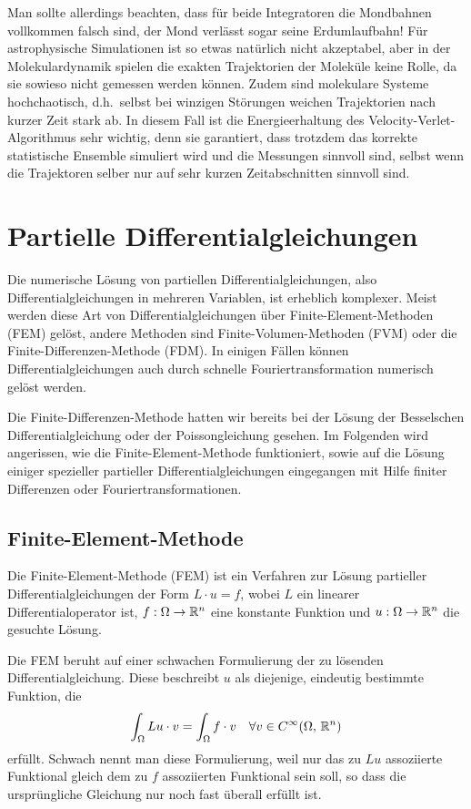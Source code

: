 Man sollte allerdings beachten, dass für beide Integratoren die
Mondbahnen vollkommen falsch sind, der Mond verlässt sogar seine
Erdumlaufbahn! Für astrophysische Simulationen ist so etwas natürlich
nicht akzeptabel, aber in der Molekulardynamik spielen die exakten
Trajektorien der Moleküle keine Rolle, da sie sowieso nicht gemessen
werden können. Zudem sind molekulare Systeme hochchaotisch, d.h.\
selbst bei winzigen Störungen weichen Trajektorien nach kurzer Zeit
stark ab. In diesem Fall ist die Energieerhaltung des
Velocity-Verlet-Algorithmus sehr wichtig, denn sie garantiert, dass
trotzdem das korrekte statistische Ensemble simuliert wird und die
Messungen sinnvoll sind, selbst wenn die Trajektoren selber nur auf
sehr kurzen Zeitabschnitten sinnvoll sind.

\section{Partielle Differentialgleichungen}

Die numerische Lösung von partiellen Differentialgleichungen, also
Differentialgleichungen in mehreren Variablen, ist erheblich
komplexer. Meist werden diese Art von Differentialgleichungen über
Finite-Element-Methoden (FEM) gelöst, andere Methoden sind
Finite-Volumen-Methoden (FVM) oder die Finite-Differenzen-Methode
(FDM). In einigen Fällen können Differentialgleichungen auch durch
schnelle Fouriertransformation numerisch gelöst werden.

Die Finite-Differenzen-Methode hatten wir bereits bei der Lösung der
Besselschen Differentialgleichung oder der Poissongleichung gesehen.
Im Folgenden wird angerissen, wie die Finite-Element-Methode
funktioniert, sowie auf die Lösung einiger spezieller partieller
Differentialgleichungen eingegangen mit Hilfe finiter Differenzen oder
Fouriertransformationen.

\subsection{Finite-Element-Methode}

Die Finite-Element-Methode (FEM) ist ein Verfahren zur Lösung
partieller Differentialgleichungen der Form $L\cdot u = f$, wobei $L$
ein linearer Differentialoperator ist, $f:\Omega\to\mathbb{R}^n$ eine
konstante Funktion und $u:\Omega\to\mathbb{R}^n$ die gesuchte Lösung.

Die FEM beruht auf einer schwachen Formulierung der zu lösenden
Differentialgleichung. Diese beschreibt $u$ als diejenige, eindeutig
bestimmte Funktion, die
\begin{equation}
  \label{eq:fem}
  \int_\Omega Lu\cdot v = \int_\Omega f\cdot v\quad\forall v\in
  C^\infty(\Omega,\, \mathbb{R}^n)
\end{equation}
erfüllt. Schwach nennt man diese Formulierung, weil nur das zu $Lu$
assoziierte Funktional gleich dem zu $f$ assoziierten Funktional sein
soll, so dass die ursprüngliche Gleichung nur noch fast überall
erfüllt ist.

